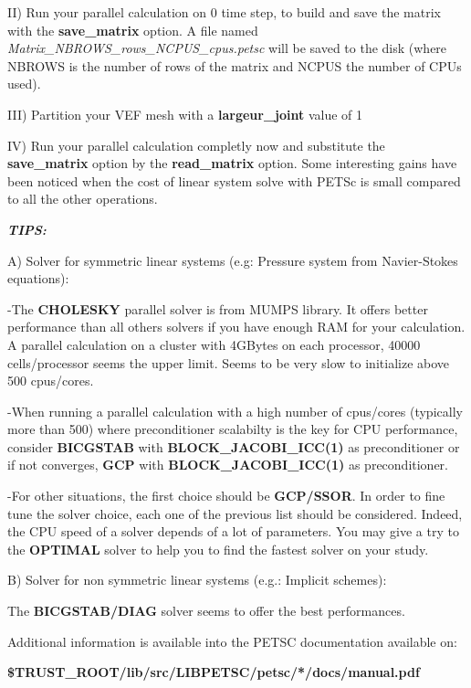II) Run your parallel calculation on 0 time step, to build and save the matrix with the \textbf{save\_matrix} option. A
file named \textit{Matrix\_NBROWS\_rows\_NCPUS\_cpus.petsc} will be saved to the disk (where NBROWS is the number of
rows of the matrix and NCPUS the number of CPUs used). 

III) Partition your VEF mesh with a \textbf{largeur\_joint} value of 1

IV) Run your parallel calculation completly now and substitute the \textbf{save\_matrix} option by the
\textbf{read\_matrix} option. Some interesting gains have been noticed when the cost of linear system solve with PETSc
is small compared to all the other operations. 


\bigskip


\bigskip

{\bfseries\itshape
TIPS:}

A) Solver for symmetric linear systems (e.g: Pressure system from Navier-Stokes equations):

{}-The \textbf{CHOLESKY} parallel solver is from MUMPS library. It offers better performance than all others solvers if
you have enough RAM for your calculation. A parallel calculation on a cluster with 4GBytes on each processor, 40000
cells/processor seems the upper limit. Seems to be very slow to initialize above 500 cpus/cores.


\bigskip

{}-When running a parallel calculation with a high number of cpus/cores (typically more than 500) where preconditioner
scalabilty is the key for CPU performance, consider \textbf{BICGSTAB }with \textbf{BLOCK\_JACOBI\_ICC(1)} as
preconditioner or if not converges, \textbf{GCP}\textbf{ }with\textbf{ BLOCK\_JACOBI\_ICC(1) }as
preconditioner.


\bigskip

{}-For other situations, the first choice should be \textbf{GCP}\textbf{/SSOR}. In order to fine
tune the solver choice, each one of the previous list should be considered. Indeed, the CPU speed of a solver depends
of a lot of parameters. You may give a try to the \textbf{OPTIMAL} solver to help you to find the fastest solver on
your study. 


\bigskip

B) Solver for non symmetric linear systems (e.g.: Implicit schemes):

The \textbf{BICGSTAB/DIAG }solver seems to offer the best performances.


\bigskip

Additional information is available into the PETSC documentation available on:

\textbf{\$TRUST\_ROOT/lib/src/LIBPETSC/petsc/*/docs/manual.pdf}
